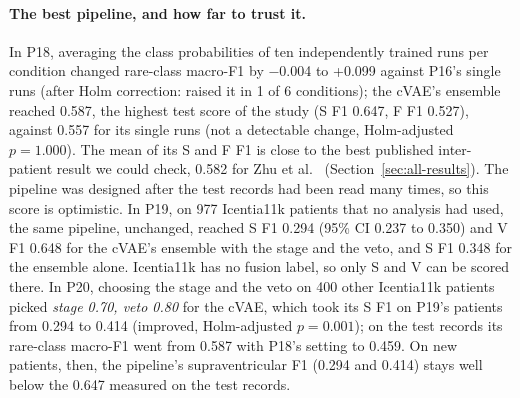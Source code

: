 \paragraph{The best pipeline, and how far to trust it.} In P18, averaging the class probabilities of ten independently trained runs per condition changed rare-class macro-F1 by $-$0.004 to +0.099 against P16's single runs (after Holm correction: raised it in 1 of 6 conditions); the cVAE's ensemble reached 0.587, the highest test score of the study (S F1 0.647, F F1 0.527), against 0.557 for its single runs (not a detectable change, Holm-adjusted $p=1.000$). The mean of its S and F F1 is close to the best published inter-patient result we could check, 0.582 for Zhu et al.~\cite{zhu2022} (Section~\ref{sec:all-results}). The pipeline was designed after the test records had been read many times, so this score is optimistic. In P19, on 977 Icentia11k patients that no analysis had used, the same pipeline, unchanged, reached S F1 0.294 (95\% CI 0.237 to 0.350) and V F1 0.648 for the cVAE's ensemble with the stage and the veto, and S F1 0.348 for the ensemble alone. Icentia11k has no fusion label, so only S and V can be scored there. In P20, choosing the stage and the veto on 400 other Icentia11k patients picked \emph{stage 0.70, veto 0.80} for the cVAE, which took its S F1 on P19's patients from 0.294 to 0.414 (improved, Holm-adjusted $p=0.001$); on the test records its rare-class macro-F1 went from 0.587 with P18's setting to 0.459. On new patients, then, the pipeline's supraventricular F1 (0.294 and 0.414) stays well below the 0.647 measured on the test records.
